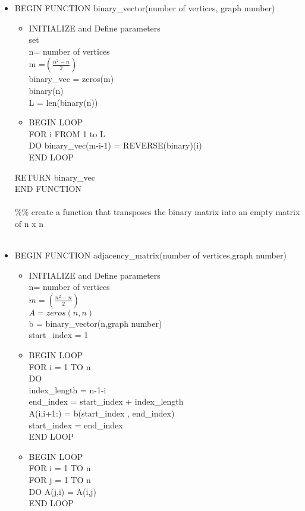 \documentclass{Assignment}
\begin{document}
\begin{itemize} \item BEGIN FUNCTION binary\_vector(number of vertices, graph number)
\begin{itemize}
	
\item INITIALIZE and Define parameters\\
set\\
n= number of vertices  \\
 m =$\left(\frac{n^2-n}{2}\right)$\\
binary\_vec = zeros(m)\\
binary(n)\\
L = len(binary(n))
\item BEGIN LOOP\\
FOR i FROM 1 to L\\
  \hspace*{0.5cm} DO binary\_vec(m-i-1) = REVERSE(binary)(i)\\
  END LOOP
\end{itemize}
\hspace*{0.5cm}RETURN binary\_vec\\
END FUNCTION\\\\
\%\% create a function that transposes the binary matrix into an empty matrix of n x n\\\\
\item BEGIN FUNCTION adjacency\_matrix(number of vertices,graph number)
\begin{itemize}
\item INITIALIZE and Define parameters\\
n= number of vertices\\
$m = \left(\frac{n^2-n}{2}\right)$\\
$A = zeros(n,n)$\\
b =  binary\_vector(n,graph number)\\
start\_index = 1
\item BEGIN LOOP\\
FOR i = 1 TO n\\
 \hspace*{0.5cm} DO\\
  \hspace*{0.5cm}index\_length = n-1-i\\
 \hspace*{0.5cm} end\_index = start\_index + index\_length\\
 \hspace*{0.5cm} A(i,i+1:) = b(start\_index , end\_index)\\
 \hspace*{0.5cm} start\_index = end\_index\\
END LOOP
 \item BEGIN LOOP\\
 FOR i = 1 TO n\\
 FOR j = 1 TO n\\
 \hspace*{0.5cm} DO A(j,i) = A(i,j)\\
 END LOOP


\end{itemize}
\end{itemize}
\end{document}
